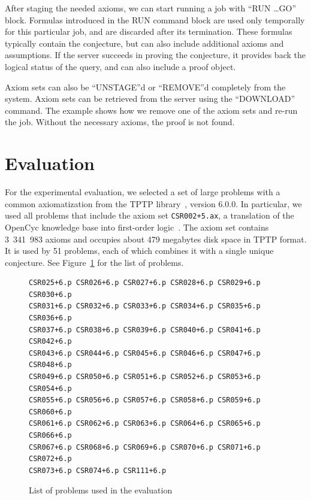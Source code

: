 \documentclass{article}
\begin{document}
 After
staging the needed axioms, we can start running a job with ``RUN
\ldots GO'' block. Formulas introduced in the RUN command block are
used only temporally for this particular job, and are discarded after
its termination. These formulas typically contain the conjecture, but
can also include additional axioms and assumptions. If the server
succeeds in proving the conjecture, it provides back the logical
status of the query, and can also include a proof object.

 Axiom sets
can also be ``UNSTAGE''d or ``REMOVE''d completely from the
system. Axiom sets can be retrieved from the server using the
``DOWNLOAD'' command. The example shows how we remove one of the axiom
sets and re-run the job.  Without the necessary axioms, the proof is
not found.

\section{Evaluation}

For the experimental evaluation, we selected a set of large problems
with a common axiomatization from the TPTP
library~\cite{Sutcliffe:JAR-2009}, version 6.0.0. In particular, we
used all problems that include the axiom set \texttt{CSR002+5.ax}, a
translation of the OpenCyc knowledge base into first-order
logic~\cite{RRG:CO-2005}. The axiom set contains 3~341~983 axioms and
occupies about 479 megabytes disk space in TPTP format. It is used by
51 problems, each of which combines it with a single unique
conjecture. See Figure~\ref{fig:csrprobs} for the list of problems.

\begin{figure}
  \centering  
\begin{lstlisting}
CSR025+6.p CSR026+6.p CSR027+6.p CSR028+6.p CSR029+6.p CSR030+6.p
CSR031+6.p CSR032+6.p CSR033+6.p CSR034+6.p CSR035+6.p CSR036+6.p
CSR037+6.p CSR038+6.p CSR039+6.p CSR040+6.p CSR041+6.p CSR042+6.p
CSR043+6.p CSR044+6.p CSR045+6.p CSR046+6.p CSR047+6.p CSR048+6.p
CSR049+6.p CSR050+6.p CSR051+6.p CSR052+6.p CSR053+6.p CSR054+6.p
CSR055+6.p CSR056+6.p CSR057+6.p CSR058+6.p CSR059+6.p CSR060+6.p
CSR061+6.p CSR062+6.p CSR063+6.p CSR064+6.p CSR065+6.p CSR066+6.p
CSR067+6.p CSR068+6.p CSR069+6.p CSR070+6.p CSR071+6.p CSR072+6.p
CSR073+6.p CSR074+6.p CSR111+6.p
\end{lstlisting}
  \caption{List of problems used in the evaluation}
  \label{fig:csrprobs}
\end{figure}
\end{document}
